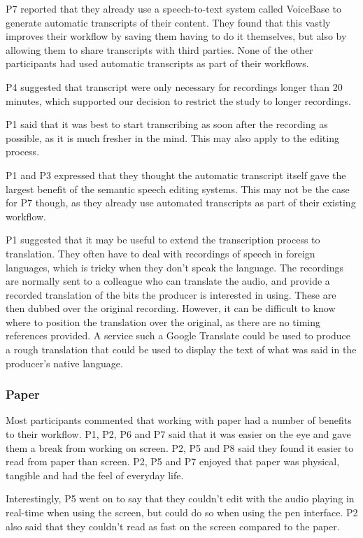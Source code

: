 P7 reported that they already use a speech-to-text system called VoiceBase to generate automatic transcripts of their
content. They found that this vastly improves their workflow by saving them having to do it themselves, but also by
allowing them to share transcripts with third parties. None of the other participants had used automatic transcripts as
part of their workflows.

P4 suggested that transcript were only necessary for recordings longer than 20 minutes, which supported our decision to
restrict the study to longer recordings.

P1 said that it was best to start transcribing as soon after the recording as possible, as it is much fresher in the
mind. This may also apply to the editing process.

P1 and P3 expressed that they thought the automatic transcript itself gave the largest benefit of the semantic speech
editing systems. This may not be the case for P7 though, as they already use automated transcripts as part of their
existing workflow.

P1 suggested that it may be useful to extend the transcription process to translation. They often have to deal with
recordings of speech in foreign languages, which is tricky when they don't speak the language. The recordings are
normally sent to a colleague who can translate the audio, and provide a recorded translation of the bits the producer
is interested in using. These are then dubbed over the original recording. However, it can be difficult to know where
to position the translation over the original, as there are no timing references provided. A service such a Google
Translate could be used to produce a rough translation that could be used to display the text of what was said in the
producer's native language.

\subsubsection{Paper}

Most participants commented that working with paper had a number of benefits to their workflow. P1, P2, P6 and P7 said
that it was easier on the eye and gave them a break from working on screen. P2, P5 and P8 said they found it easier to
read from paper than screen. P2, P5 and P7 enjoyed that paper was physical, tangible and had the feel of everyday life.

Interestingly, P5 went on to say that they couldn't edit with the audio playing in real-time when using the screen, but
could do so when using the pen interface. P2 also said that they couldn't read as fast on the screen compared to the
paper.

